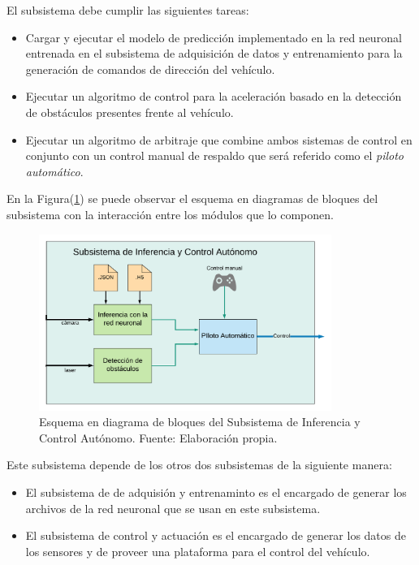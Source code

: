     El subsistema debe cumplir las siguientes tareas:
    \begin{itemize}
        \item Cargar y ejecutar el modelo de predicción implementado en la red neuronal entrenada en el subsistema de adquisición de datos y entrenamiento para la generación de comandos de dirección del vehículo.
        \item Ejecutar un algoritmo de control para la aceleración basado en la detección de obstáculos presentes frente al vehículo.
        \item Ejecutar un algoritmo de arbitraje que combine ambos sistemas de control en conjunto con un control manual de respaldo que será referido como el \textit{piloto automático}.
    \end{itemize}

    En la Figura(\ref{fig:inferencia_esq}) se puede observar el esquema en diagramas de bloques del subsistema con la interacción entre los módulos que 
    lo componen.
    \begin{figure}[!h] 
        \centering
        \includegraphics[width=0.85\textwidth]{img/inferencia_esq}
        \caption[Subsistema de Inferencia y Control Autónomo]{Esquema en diagrama de bloques del Subsistema de Inferencia y Control Autónomo. Fuente: Elaboración propia. }
        \label{fig:inferencia_esq}
    \end{figure}

    Este subsistema depende de los otros dos subsistemas de la siguiente manera:
    \begin{itemize}
        \item El subsistema de de adquisión y entrenaminto es el encargado de generar los archivos de la red neuronal que se usan en este subsistema.
        \item El subsistema de control y actuación es el encargado de generar los datos de los sensores y de proveer una plataforma para el control del vehículo.
    \end{itemize}

